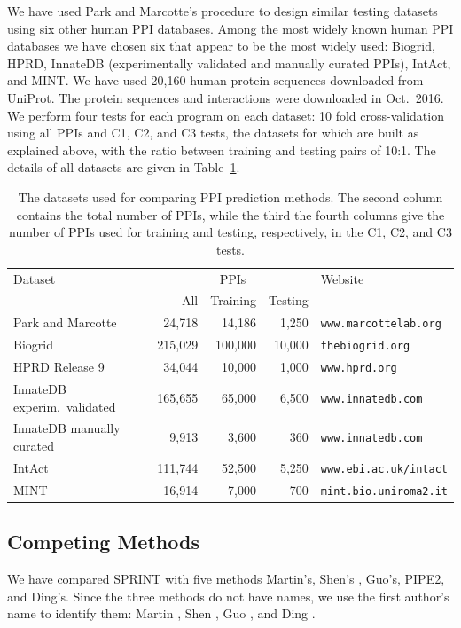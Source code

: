 We have used Park and Marcotte's procedure to design similar testing datasets using six other human PPI databases. Among the most widely known human PPI databases we have chosen six that appear to be the most widely used: Biogrid, HPRD, InnateDB (experimentally validated and manually curated PPIs), IntAct, and MINT. We have used 20,160 human protein sequences downloaded from UniProt. The protein sequences and interactions were downloaded in Oct.~2016. We perform four tests for each program on each dataset: 10 fold cross-validation using all PPIs and C1, C2, and C3 tests, the datasets for which are built as explained above, with the ratio between training and testing pairs of 10:1. The details of all datasets are given in Table~\ref{table_datasets}. 

\begin{table}
\centering
\caption[The datasets used for comparing PPI prediction methods]{The datasets used for comparing PPI prediction methods. The second column contains the total number of PPIs, while the third the fourth columns give the number of PPIs used for training and testing, respectively, in the C1, C2, and C3 tests.}
\label{table_datasets}
\begin{tabular}{@{}lrrrl@{}}
\toprule
Dataset & \multicolumn{3}{c}{PPIs} & Website  \\ \cmidrule{2-4}
	 & All & Training & Testing &  \\ \midrule
Park and Marcotte & 24,718 & 14,186 & 1,250 & \texttt{www.marcottelab.org} \\ 
Biogrid  & 215,029 & 100,000 & 10,000 & \texttt{thebiogrid.org} \\
HPRD Release 9 & 34,044 & 10,000 & 1,000 & \texttt{www.hprd.org} \\ 
InnateDB experim.~validated & 165,655 & 65,000 & 6,500 & \texttt{www.innatedb.com} \\ 
InnateDB manually curated & 9,913 &3,600 & 360 & \texttt{www.innatedb.com} \\ 
IntAct & 111,744 & 52,500 & 5,250 & \texttt{www.ebi.ac.uk/intact} \\ 
MINT & 16,914 & 7,000 & 700 & \texttt{mint.bio.uniroma2.it} \\ \bottomrule
\end{tabular}
\end{table}

\subsection{Competing Methods}
We have compared SPRINT with five methods Martin's\cite{Martin05_PPIpred}, Shen's \cite{Shen07_PPIpred}, Guo's\cite{Guo08_PPIpred}, PIPE2\cite{Pitre08_PIPE2}, and Ding's\cite{ding2016predicting}.  Since the three methods do not have names, we use the first author's name to identify them: Martin \cite{Martin05_PPIpred}, Shen \cite{Shen07_PPIpred}, Guo \cite{Guo08_PPIpred}, and Ding \cite{ding2016predicting}.

